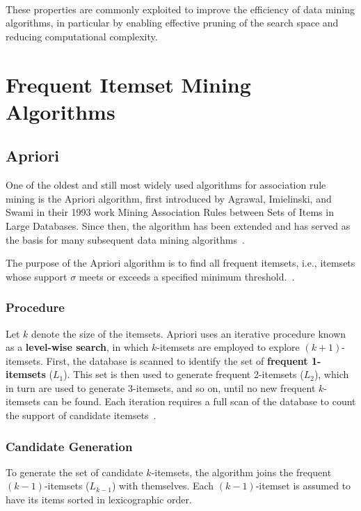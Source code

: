 ~\parencite{Pei2002}

These properties are commonly exploited to improve the efficiency of data mining algorithms, in particular by enabling effective pruning of the search space and reducing computational complexity.

\section{Frequent Itemset Mining Algorithms}

\subsection{Apriori}

One of the oldest and still most widely used algorithms for association rule mining is the Apriori algorithm, first introduced by Agrawal, Imielinski, and Swami in their 1993 work Mining Association Rules between Sets of Items in Large Databases.  
Since then, the algorithm has been extended and has served as the basis for many subsequent data mining algorithms~\parencite{bodon2003fast}.

The purpose of the Apriori algorithm is to find all frequent itemsets, i.e., itemsets whose support $\sigma$ meets or exceeds a specified minimum threshold.~\parencite{bodon2003fast}.

\subsubsection{Procedure}

Let $k$ denote the size of the itemsets. Apriori uses an iterative procedure known as a \textbf{level-wise search}, in which $k$-itemsets are employed to explore $(k+1)$-itemsets. First, the database is scanned to identify the set of \textbf{frequent 1-itemsets} ($L_1$). This set is then used to generate frequent 2-itemsets ($L_2$), which in turn are used to generate 3-itemsets, and so on, until no new frequent $k$-itemsets can be found. Each iteration requires a full scan of the database to count the support of candidate itemsets~\parencite{Han2012}.

\subsubsection{Candidate Generation}

To generate the set of candidate $k$-itemsets, the algorithm joins the frequent $(k-1)$-itemsets ($L_{k-1}$) with themselves. Each $(k-1)$-itemset is assumed to have its items sorted in lexicographic order.

